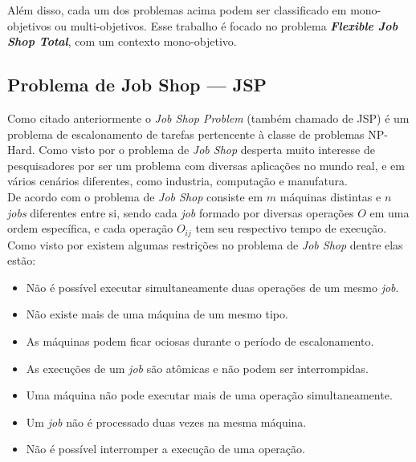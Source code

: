         Além disso, cada um dos problemas acima podem ser classificado em mono-objetivos ou multi-objetivos. Esse trabalho é focado no problema \textbf{\textit{Flexible Job Shop Total}}, com um contexto mono-objetivo.\\
        


    \subsection{Problema de Job Shop — JSP}
            Como citado anteriormente o \textit{Job Shop Problem} (também chamado de JSP) é um problema de escalonamento de tarefas pertencente à classe de problemas NP-Hard. Como visto por \cite{Cheng1996} o problema de \textit{Job Shop} desperta muito interesse de pesquisadores por ser um problema com diversas aplicações no mundo real, e em vários cenários diferentes, como industria, computação e manufatura.\\

            De acordo com \cite{Cheng1996} o problema de \textit{Job Shop} consiste em $m$ máquinas distintas e $n$ \textit{jobs} diferentes entre si, sendo cada \textit{job} formado por diversas operações $O$ em uma ordem específica, e cada operação $O_{ij}$ tem seu respectivo tempo de execução.\\

            \noindent Como visto por \cite{Bagchi1999} existem algumas restrições no problema de \textit{Job Shop} dentre elas estão:
            \begin{itemize}
                \item Não é possível executar simultaneamente duas operações de um mesmo \textit{job}.
                \item Não existe mais de uma máquina de um mesmo tipo.
                \item As máquinas podem ficar ociosas durante o período de escalonamento.
                \item As execuções de um \textit{job} são atômicas e não podem ser interrompidas.
                \item Uma máquina não pode executar mais de uma operação simultaneamente.
                \item Um \textit{job} não é processado duas vezes na mesma máquina.
                \item Não é possível interromper a execução de uma operação.
            \end{itemize}
        
